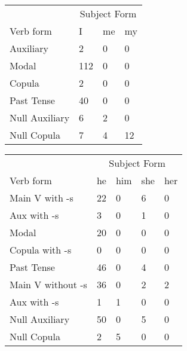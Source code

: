 \begin{table}[]
    \begin{minipage}{0.5\textwidth}
    \centering
    \begin{tabular}{@{}llll@{}}
        \toprule
            &\multicolumn{3}{c}{Subject Form}\\
            \cline{2-4}
        Verb form & I & me & my \\
        \midrule
        Auxiliary & 2 & 0 & 0 \\
        Modal & 112 & 0 & 0 \\
        Copula & 2 & 0 & 0 \\
        Past Tense & 40 & 0 & 0 \\
        \hline
        Null Auxiliary & 6 & 2 & 0 \\
        Null Copula & 7 & 4 & 12 \\
        \bottomrule
    \end{tabular}
\end{minipage}
\begin{minipage}{0.5\textwidth}
    \centering
    \begin{tabular}{@{}lllll@{}}
        \toprule
            &\multicolumn{4}{c}{Subject Form}\\
            \cline{2-5}
        Verb form & he & him & she & her \\
        \midrule
        Main V with -s & 22 & 0 & 6 & 0 \\
        Aux with -s & 3 & 0 & 1 & 0 \\
        Modal & 20 & 0 & 0 & 0 \\
        Copula with -s & 0 & 0 & 0 & 0 \\
        Past Tense & 46 & 0 & 4 & 0 \\
        \hline
        Main V without -s & 36 & 0 & 2 & 2 \\
        Aux with -s & 1 & 1 & 0 & 0 \\
        Null Auxiliary & 50 & 0 & 5 & 0 \\
        Null Copula & 2 & 5 & 0 & 0 \\
        \bottomrule
    \end{tabular}
\end{minipage}
\end{table}

